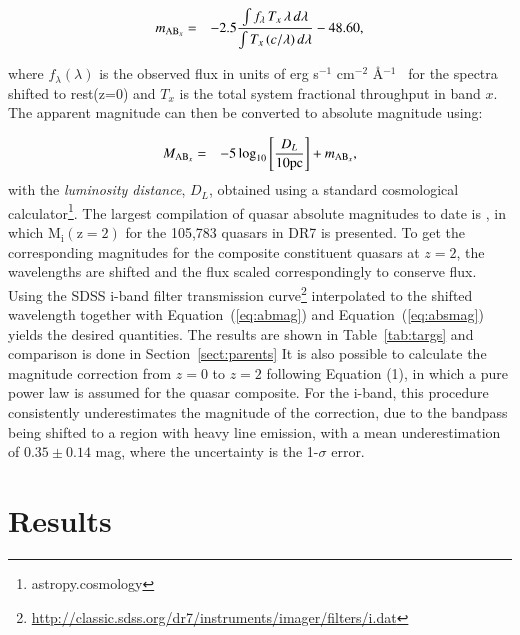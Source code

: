 \documentclass{aa}    %
\newcommand{\Tab}[1]{Table~\ref{tab:#1}}
\newcommand{\tab}[1]{\Tab{#1}}
\newcommand{\Eq}[1]{Equation~(\ref{eq:#1})}
\newcommand{\eq}[1]{\Eq{#1}}
\newcommand{\eqlabel}[1]{\label{eq:#1}}
\newcommand{\sectionname}{Section}
\newcommand{\Sect}[1]{\sectionname~\ref{sect:#1}}
\newcommand{\sect}[1]{\Sect{#1}}
\newcommand{\sectlabel}[1]{\label{sect:#1}}
\newcommand{\fluxunit}{erg s$^{-1}$ cm$^{-2}$ \AA$^{-1}$}
\begin{document}
\begin{eqnarray}\eqlabel{abmag}
m_{\textmd{AB}_x} &=& -2.5  \frac{\int f_\lambda \,  T_{x}  \, \lambda \,  d\lambda} 
{\int  T_{x} \,  (c / \lambda) \,  d\lambda}  - 48.60,
\end{eqnarray}
 
 
where $f_\lambda (\lambda)$ is the observed flux in units of \fluxunit~ for the spectra shifted to rest(z=0) and $T_{x} $ is the total system fractional throughput in band $x$. The apparent magnitude can then be converted to absolute magnitude using:

\begin{eqnarray}\eqlabel{absmag}
M_{\textmd{AB}_x} &=& -5 \log_{10} \left[  \frac{D_L }{10 \mathrm{pc}}   \right] + m_{\textmd{AB}_x} ,
\end{eqnarray}
with the \textit{luminosity distance}, $D_L$,  obtained using a standard cosmological calculator\footnote{astropy.cosmology}.
 The largest compilation of quasar absolute magnitudes to date is \cite{Shen2011}, in which $\mathrm{M_i (z=2)}$ for the 105,783 quasars in DR7 is presented. To get the corresponding magnitudes for the composite constituent quasars at $z = 2$, the wavelengths are shifted and the flux scaled correspondingly to conserve flux. Using the SDSS i-band filter transmission curve\footnote{\url{http://classic.sdss.org/dr7/instruments/imager/filters/i.dat}} interpolated to the shifted wavelength together with \eq{abmag} and \eq{absmag} yields the desired quantities. The results are shown in \tab{targs} and comparison is done in \sect{parents}
 It is also possible to calculate the magnitude correction from $z = 0$ to $z = 2$ following \cite{Richards2006a} Equation (1), in which a pure power law is assumed for the quasar composite. For the i-band, this procedure consistently underestimates the magnitude of the correction, due to the bandpass being shifted to a region with heavy line emission, with a mean underestimation of $0.35 \pm 0.14$ mag, where the uncertainty is the 1-$\sigma$ error.







\section{Results}   \sectlabel{results}
\end{document}
